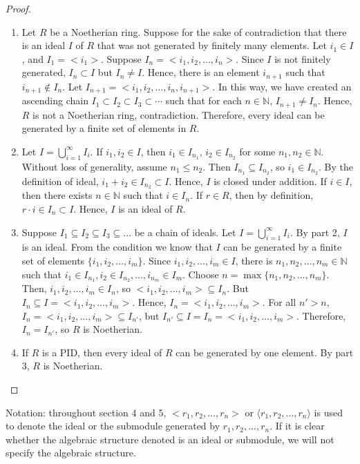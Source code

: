\documentclass[12pt]{article}
\newcommand{\N}{\mathbb{N}}
\begin{document}
\begin{proof}
\begin{enumerate}
    \item Let $R$ be a Noetherian ring. Suppose for the sake of contradiction that there is an ideal $I$ of $R$ that was not generated by finitely many elements. Let $i_1 \in I$, and $I_1 = <i_1>$. Suppose $I_n = <i_1, i_2, \ldots, i_n>$. Since $I$ is not finitely generated, $I_n \subset I$ but $I_n \neq I$. Hence, there is an element $i_{n+1}$ such that $i_{n+1} \notin I_n$. Let $I_{n+1} = <i_1, i_2, \ldots, i_n, i_{n+1}>$. In this way, we have created an ascending chain $I_1 \subset I_2 \subset I_3 \subset \cdots $ such that for each $n \in \N$, $I_{n+1} \neq I_n$. Hence, $R$ is not a Noetherian ring, contradiction. Therefore, every ideal can be generated by a finite set of elements in $R$.
    \item Let $I = \bigcup_{i=1}^\infty I_i$. If $i_1, i_2 \in I$, then $i_1 \in I_{n_1}$, $i_2 \in I_{n_2}$ for some $n_1, n_2 \in \N$. Without loss of generality, assume $n_1 \leq n_2$. Then $I_{n_1} \subseteq I_{n_2}$, so $i_1 \in I_{n_2}$. By the definition of ideal, $i_1 + i_2 \in I_{n_2} \subset I$. Hence, $I$ is closed under addition. If $i \in I$, then there exists $n \in \N$ such that $i \in I_n$. If $r \in R$, then by definition, $r \cdot i \in I_n \subset I$. Hence, $I$ is an ideal of $R$.
    \item Suppose $I_1 \subseteq I_2 \subseteq I_3 \subseteq \ldots$ be a chain of ideals. Let $I = \bigcup_{i=1}^\infty I_i$. By part 2, $I$ is an ideal. From the condition we know that $I$ can be generated by a finite set of elements $\{i_1, i_2, \ldots, i_m\}$. Since $i_1, i_2, \ldots, i_m \in I$, there is $n_1, n_2, \ldots, n_m \in \N$ such that $i_1 \in I_{n_1}, i_2 \in I_{n_2}, \ldots, i_{n_m} \in I_m$. Choose $n = \max \{n_1, n_2, \ldots, n_m\}$. Then, $i_1, i_2, \ldots, i_m \in I_n$, so $<i_1, i_2, \ldots, i_m> \subseteq I_n$. But $I_n \subseteq I = <i_1, i_2, \ldots, i_m>$. Hence, $I_n = <i_1, i_2, \ldots, i_m>$. For all $n' > n $, $I_n = <i_1, i_2, \ldots, i_m> \subseteq I_{n'}$, but $I_{n'} \subseteq I = I_n = <i_1, i_2, \ldots, i_m>$. Therefore, $I_n = I_{n'}$, so $R$ is Noetherian.
    \item If $R$ is a PID, then every ideal of $R$ can be generated by one element. By part 3, $R$ is Noetherian.
\end{enumerate}


\end{proof}
Notation: throughout section $4$ and $5$, $<r_1, r_2, \ldots, r_n>$ or $\langle r_1, r_2, \ldots, r_n \rangle$ is used to denote the ideal or the submodule generated by $r_1, r_2, \ldots, r_n$. If it is clear whether the algebraic structure denoted is an ideal or submodule, we will not specify the algebraic structure.
\newpage 
\end{document}
